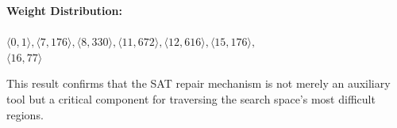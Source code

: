 \begin{colorexamplebox}
\tcbline

\textbf{Weight Distribution:}\\\\
$\langle 0, 1\rangle, \langle 7, 176\rangle, \langle 8, 330\rangle, \langle 11, 672\rangle, \langle 12, 616\rangle, \langle 15, 176\rangle, $\\
$\langle 16, 77\rangle$\\
\end{colorexamplebox}

\noindent This result confirms that the SAT repair mechanism is not merely an auxiliary tool but a critical component for traversing the search space's most difficult regions.
